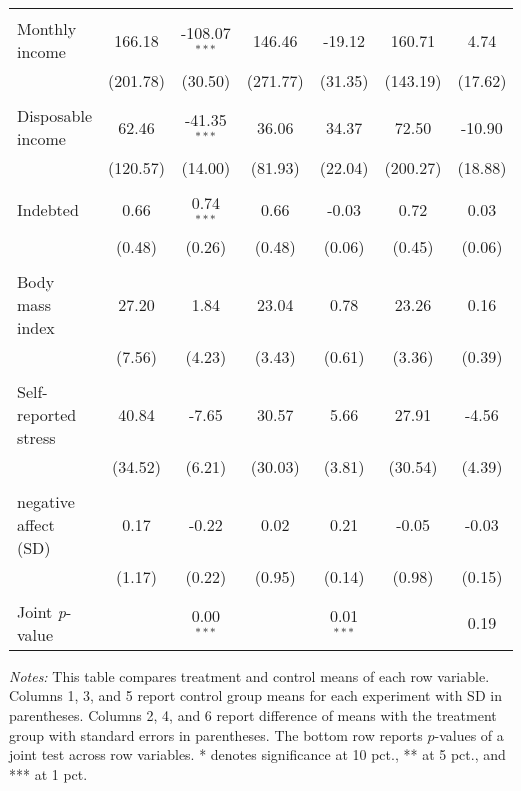 \begin{table}[htbp]
{\begin{threeparttable}
\begin{tabular}{l*{6}{c}}
          &         &         &         &         &         &         \\
Monthly income&   166.18&-108.07$^{***}$&   146.46&   -19.12&   160.71&     4.74\\
          & (201.78)&  (30.50)& (271.77)&  (31.35)& (143.19)&  (17.62)\\
          &         &         &         &         &         &         \\
Disposable income&    62.46&-41.35$^{***}$&    36.06&    34.37&    72.50&   -10.90\\
          & (120.57)&  (14.00)&  (81.93)&  (22.04)& (200.27)&  (18.88)\\
          &         &         &         &         &         &         \\
Indebted  &     0.66&0.74$^{***}$&     0.66&    -0.03&     0.72&     0.03\\
          &   (0.48)&   (0.26)&   (0.48)&   (0.06)&   (0.45)&   (0.06)\\
          &         &         &         &         &         &         \\
Body mass index&    27.20&     1.84&    23.04&     0.78&    23.26&     0.16\\
          &   (7.56)&   (4.23)&   (3.43)&   (0.61)&   (3.36)&   (0.39)\\
          &         &         &         &         &         &         \\
Self-reported stress&    40.84&    -7.65&    30.57&     5.66&    27.91&    -4.56\\
          &  (34.52)&   (6.21)&  (30.03)&   (3.81)&  (30.54)&   (4.39)\\
          &         &         &         &         &         &         \\
negative affect (SD)&     0.17&    -0.22&     0.02&     0.21&    -0.05&    -0.03\\
          &   (1.17)&   (0.22)&   (0.95)&   (0.14)&   (0.98)&   (0.15)\\
          &         &         &         &         &         &         \\
\midrule Joint \emph{p}-value&         &0.00$^{***}$&         &0.01$^{***}$&         &     0.19\\
\bottomrule \end{tabular} \begin{tablenotes}[flushleft] \footnotesize \item \emph{Notes:} This table compares treatment and control means of each row variable. Columns 1, 3, and 5 report control group means for each experiment with SD in parentheses. Columns 2, 4, and 6 report difference of means with the treatment group with standard errors in parentheses. The bottom row reports \(p\)-values of a joint test across row variables.  * denotes significance at 10 pct., ** at 5 pct., and *** at 1 pct. \end{tablenotes} \end{threeparttable} } \end{table}
